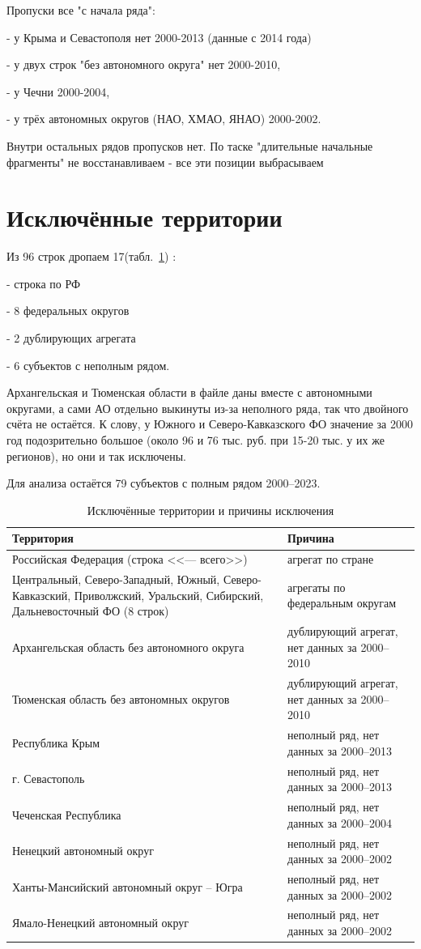 \documentclass[12pt,a4paper]{report}
\begin{document}
Пропуски все "с начала ряда": 

- у Крыма и Севастополя нет 2000-2013 (данные с 2014 года)

- у двух строк "без автономного округа" нет 2000-2010, 

- у Чечни 2000-2004, 

- у трёх автономных округов (НАО, ХМАО, ЯНАО) 2000-2002. 

Внутри остальных рядов пропусков нет. По таске "длительные начальные фрагменты" не восстанавливаем - все эти позиции выбрасываем

\clearpage
\section{Исключённые территории}

Из 96 строк дропаем 17(табл.~\ref{tab:excluded}) : 

- строка по РФ

- 8 федеральных округов

- 2 дублирующих агрегата

- 6 субъектов с неполным рядом. 

Архангельская и Тюменская области в файле даны вместе с автономными округами, а сами АО отдельно выкинуты из-за неполного ряда, так что двойного счёта не остаётся. 
К слову, у Южного и Северо-Кавказского ФО значение за 2000 год подозрительно большое (около 96 и 76 тыс. руб. при 15-20 тыс. у их же регионов), но они и так исключены.

Для анализа остаётся 79 субъектов с полным рядом 2000--2023.

\begin{table}[H]
\centering
\caption{Исключённые территории и причины исключения}
\label{tab:excluded}
\small
\begin{tabular}{p{8.2cm}p{7.8cm}}
\toprule
Территория & Причина \\
\midrule
Российская Федерация (строка <<--- всего>>) & агрегат по стране \\
Центральный, Северо-Западный, Южный, Северо-Кавказский, Приволжский, Уральский, Сибирский, Дальневосточный ФО (8 строк) & агрегаты по федеральным округам \\
Архангельская область без автономного округа & дублирующий агрегат, нет данных за 2000--2010 \\
Тюменская область без автономных округов & дублирующий агрегат, нет данных за 2000--2010 \\
Республика Крым & неполный ряд, нет данных за 2000--2013 \\
г. Севастополь & неполный ряд, нет данных за 2000--2013 \\
Чеченская Республика & неполный ряд, нет данных за 2000--2004 \\
Ненецкий автономный округ & неполный ряд, нет данных за 2000--2002 \\
Ханты-Мансийский автономный округ -- Югра & неполный ряд, нет данных за 2000--2002 \\
Ямало-Ненецкий автономный округ & неполный ряд, нет данных за 2000--2002 \\
\bottomrule
\end{tabular}
\end{table}
\end{document}

